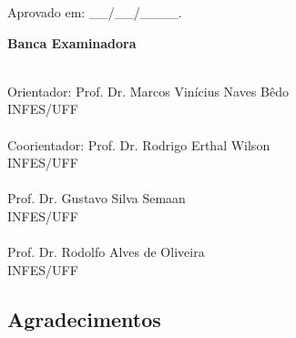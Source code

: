 
\begin{flushleft}
\begin{minipage}{15.6cm}
\hspace{0.3cm} Aprovado em: \_\_/\_\_/\_\_\_\_.
\end{minipage}
\end{flushleft}
 
\begin{center}
\Large \textbf{Banca Examinadora}
\end{center}
\vspace{1.5cm}

\begin{flushright}
\begin{minipage}[l]{12cm}
\begin{center}
\uline{\hspace{10.5cm}} \\
Orientador: Prof. Dr. Marcos Vinícius Naves Bêdo \\ INFES/UFF \\
\vspace{1cm}
\uline{\hspace{10.5cm}} \\
Coorientador: Prof. Dr. Rodrigo Erthal Wilson \\ INFES/UFF \\
\vspace{1cm}
\uline{\hspace{10.5cm}} \\
Prof. Dr. Gustavo Silva Semaan\\ INFES/UFF\\
\vspace{1cm}
\uline{\hspace{10.5cm}} \\
Prof. Dr. Rodolfo Alves de Oliveira\\ INFES/UFF

\end{center}
\end{minipage}
\end{flushright}

\newpage
\blankpage

\begin{center}
\section*{Agradecimentos}
\end{center}

